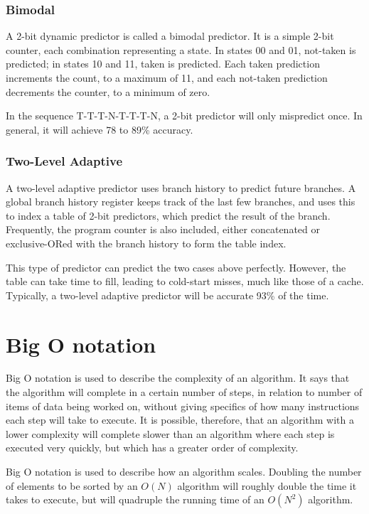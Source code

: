 \subsubsection{Bimodal}
A 2-bit dynamic predictor is called a bimodal predictor. It is a simple 2-bit
counter, each combination representing a state. In states 00 and 01, not-taken
is predicted; in states 10 and 11, taken is predicted. Each taken prediction
increments the count, to a maximum of 11, and each not-taken prediction
decrements the counter, to a minimum of zero.

In the sequence T-T-T-N-T-T-T-N, a 2-bit predictor will only mispredict once.
In general, it will achieve 78 to 89\% accuracy.

\subsubsection{Two-Level Adaptive}
A two-level adaptive predictor uses branch history to predict future branches. A
global branch history register keeps track of the last few branches, and uses
this to index a table of 2-bit predictors, which predict the result of the
branch. Frequently, the program counter is also included, either concatenated or
exclusive-ORed with the branch history to form the table index.

This type of predictor can predict the two cases above perfectly.  However, the
table can take time to fill, leading to cold-start misses, much like those of a
cache. Typically, a two-level adaptive predictor will be accurate 93\% of the time.

\section{Big O notation}
Big O notation is used to describe the complexity of an algorithm. It says that
the algorithm will complete in a certain number of steps, in relation to number
of items of data being worked on, without giving specifics of how many
instructions each step will take to execute. It is possible, therefore, that an
algorithm with a lower complexity will complete slower than an algorithm where
each step is executed very quickly, but which has a greater order of complexity.

Big O notation is used to describe how an algorithm scales. Doubling the number
of elements to be sorted by an $O(N)$ algorithm will roughly double the time it
takes to execute, but will quadruple the running time of an $O(N^2)$ algorithm.

